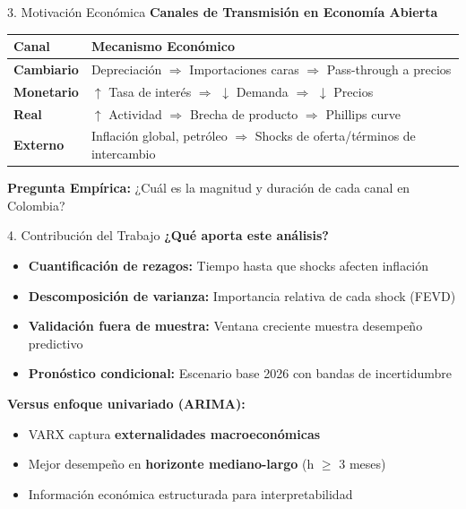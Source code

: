 \documentclass[spanish, 11pt]{beamer}
\begin{document}
\begin{frame}{3. Motivación Económica}
\textbf{Canales de Transmisión en Economía Abierta}

\vspace{0.2cm}
\begin{tabular}{lp{6cm}}
\toprule
\textbf{Canal} & \textbf{Mecanismo Económico} \\
\midrule
\textbf{Cambiario} & Depreciación $\Rightarrow$ Importaciones caras $\Rightarrow$ Pass-through a precios \\
\textbf{Monetario} & $\uparrow$ Tasa de interés $\Rightarrow$ $\downarrow$ Demanda $\Rightarrow$ $\downarrow$ Precios \\
\textbf{Real} & $\uparrow$ Actividad $\Rightarrow$ Brecha de producto $\Rightarrow$ Phillips curve \\
\textbf{Externo} & Inflación global, petróleo $\Rightarrow$ Shocks de oferta/términos de intercambio \\
\bottomrule
\end{tabular}

\vspace{0.3cm}
\textbf{Pregunta Empírica:} ¿Cuál es la magnitud y duración de cada canal en Colombia?
\end{frame}

\begin{frame}{4. Contribución del Trabajo}
\textbf{¿Qué aporta este análisis?}

\begin{itemize}
  \item \textbf{Cuantificación de rezagos:} Tiempo hasta que shocks afecten inflación
  \item \textbf{Descomposición de varianza:} Importancia relativa de cada shock (FEVD)
  \item \textbf{Validación fuera de muestra:} Ventana creciente muestra desempeño predictivo
  \item \textbf{Pronóstico condicional:} Escenario base 2026 con bandas de incertidumbre
\end{itemize}

\vspace{0.3cm}
\textbf{Versus enfoque univariado (ARIMA):}
\begin{itemize}
  \item VARX captura \textbf{externalidades macroeconómicas}
  \item Mejor desempeño en \textbf{horizonte mediano-largo} (h $\geq$ 3 meses)
  \item Información económica estructurada para interpretabilidad
\end{itemize}
\end{frame}
\end{document}
